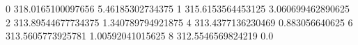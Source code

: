 0 318.0165100097656 5.46185302734375
1 315.6153564453125 3.060699462890625
2 313.89544677734375 1.340789794921875
4 313.4377136230469 0.883056640625
6 313.5605773925781 1.00592041015625
8 312.5546569824219 0.0
